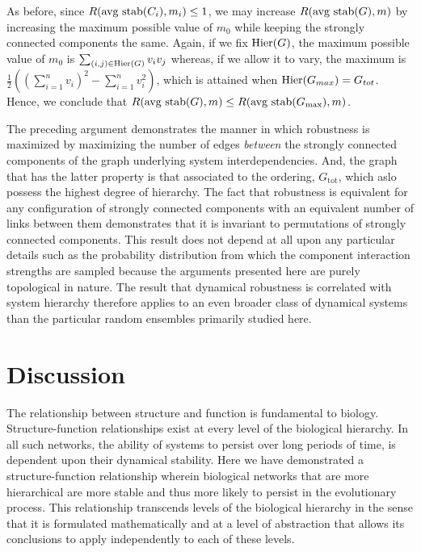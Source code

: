 As before, since $R(\hbox{avg stab} (C_i), m_i) \le 1$, we may
increase $R(\hbox{avg stab} (G), m)$ by increasing the maximum
possible value of $m_0$ while keeping the strongly connected
components the same.  Again, if we fix $\mathrm{Hier}(G)$, the maximum
possible value of $m_0$ is $\sum_{(i,j) \in \mathrm{Hier}(G)} v_i v_j$
whereas, if we allow it to vary, the maximum is $\frac{1}{2} ((\sum_{i=1}^n
v_i)^2 - \sum_{i=1}^n v_i^2)$, which is attained when $\mathrm{Hier}(G_{max}) =
G_{tot}$.  Hence, we conclude that $R(\hbox{avg stab} (G), m) \le
R(\hbox{avg stab} (G_{\mathrm{max}}), m)$.

The preceding argument demonstrates the manner in which robustness is
maximized by maximizing the number of edges \emph{between} the strongly
connected components of the graph underlying system interdependencies.
And, the graph that has the latter property is that associated to the
ordering, $G_{\mathrm{tot}}$, which aslo possess the highest degree of
hierarchy. The fact that robustness is equivalent for any configuration
of strongly connected components with an equivalent number of links
between them demonstrates that it is invariant to permutations of
strongly connected components. This result does not depend at all upon
any particular details such as the probability distribution from which
the component interaction strengths are sampled because the arguments
presented here are purely topological in nature. The result that
dynamical robustness is correlated with system hierarchy therefore
applies to an even broader class of dynamical systems than the particular
random ensembles primarily studied here.



\section{Discussion}
The relationship between structure and function is fundamental to biology. Structure-function relationships exist at every level of the biological hierarchy. In all such networks, the ability of systems to persist over long periods of time, is dependent upon their dynamical stability. Here we have demonstrated a structure-function relationship wherein biological networks that are more hierarchical are more stable and thus more likely to persist in the evolutionary process. This relationship transcends levels of the biological hierarchy in the sense that it is formulated mathematically and at a level of abstraction that allows its conclusions to apply independently to each of these levels.

